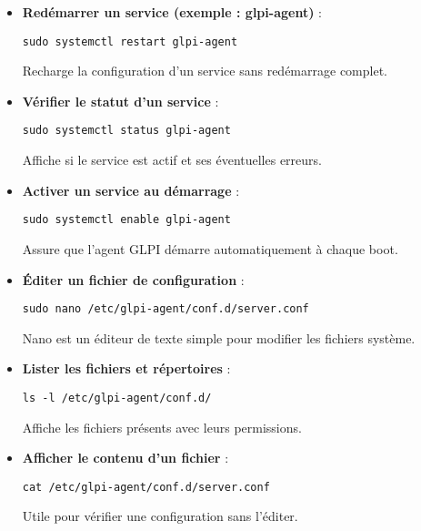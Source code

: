 \documentclass[11pt,a4paper]{article}
\begin{document}
\begin{tcolorbox}[title={3. Commandes de gestion des services}]
\begin{itemize}
  \item \textbf{Redémarrer un service (exemple : glpi-agent)} :
\begin{verbatim}
sudo systemctl restart glpi-agent
\end{verbatim}
Recharge la configuration d’un service sans redémarrage complet.

  \item \textbf{Vérifier le statut d’un service} :
\begin{verbatim}
sudo systemctl status glpi-agent
\end{verbatim}
Affiche si le service est actif et ses éventuelles erreurs.

  \item \textbf{Activer un service au démarrage} :
\begin{verbatim}
sudo systemctl enable glpi-agent
\end{verbatim}
Assure que l’agent GLPI démarre automatiquement à chaque boot.
\end{itemize}
\end{tcolorbox}

\begin{tcolorbox}[title={4. Commandes liées aux fichiers et configuration}]
\begin{itemize}
  \item \textbf{Éditer un fichier de configuration} :
\begin{verbatim}
sudo nano /etc/glpi-agent/conf.d/server.conf
\end{verbatim}
Nano est un éditeur de texte simple pour modifier les fichiers système.

  \item \textbf{Lister les fichiers et répertoires} :
\begin{verbatim}
ls -l /etc/glpi-agent/conf.d/
\end{verbatim}
Affiche les fichiers présents avec leurs permissions.

  \item \textbf{Afficher le contenu d’un fichier} :
\begin{verbatim}
cat /etc/glpi-agent/conf.d/server.conf
\end{verbatim}
Utile pour vérifier une configuration sans l’éditer.
\end{itemize}
\end{tcolorbox}
\end{document}
